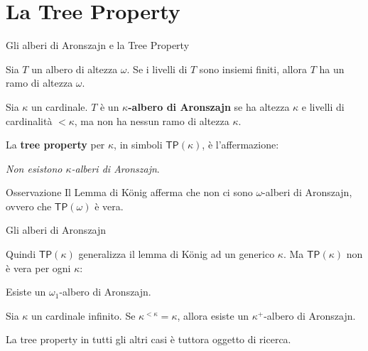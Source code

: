 \documentclass{beamer}
\theoremstyle{num.custom-title}
\theoremstyle{custom-title}
\newcommand{\TP}{\ensuremath{\mathsf{TP}}\xspace}
\renewcommand{\emph}[1]{\textbf{#1}}
\begin{document}
\section{La Tree Property}

\begin{frame}{Gli alberi di Aronszajn e la Tree Property}

\begin{lemma}[König]
Sia $T$ un albero di altezza $\omega$. Se i livelli di $T$ sono insiemi finiti, allora $T$ ha un ramo di altezza $\omega$.
\end{lemma}

\begin{definition}
Sia $\kappa$ un cardinale. $T$ è un \emph{$\kappa$-albero di Aronszajn} se ha altezza $\kappa$ e livelli di cardinalità $< \kappa$, ma non ha nessun ramo di altezza $\kappa$.
\end{definition}

La \emph{tree property} per $\kappa$, in simboli $\TP(\kappa)$, è l'affermazione:
\vspace{-3pt}
\begin{center}
\textit{Non esistono $\kappa$-alberi di Aronszajn}.
\end{center}

\begin{alertblock}{Osservazione}
Il Lemma di König afferma che non ci sono $\omega$-alberi di Aronszajn, ovvero che $\TP(\omega)$ è vera.
\end{alertblock}

\end{frame}


\begin{frame}{Gli alberi di Aronszajn}

Quindi $\TP(\kappa)$ generalizza il lemma di König ad un generico $\kappa$. \pause Ma $\TP(\kappa)$ non è vera per ogni $\kappa$:

\pause

\begin{theorem}[Aronszajn, 1934]
Esiste un $\omega_1$-albero di Aronszajn.
\end{theorem}

\pause

\begin{theorem}[Specker, 1949]
Sia $\kappa$ un cardinale infinito. Se $\kappa^{< \kappa} = \kappa$, allora esiste un $\kappa^+$-albero di Aronszajn.
\end{theorem}

\pause

La tree property in tutti gli altri casi è tuttora oggetto di ricerca.
\end{frame}
\end{document}
